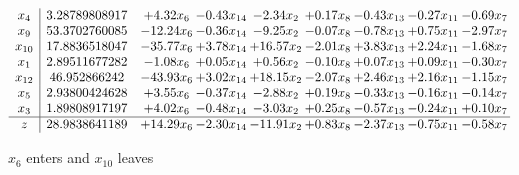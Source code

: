 \documentclass[8pt]{article}
\begin{document}
 \[\begin{array}{c| c c@{\hskip 2pt} c@{\hskip 2pt} c@{\hskip 2pt} c@{\hskip 2pt} c@{\hskip 2pt} c@{\hskip 2pt} c@{\hskip 2pt} }
 x_{4}   &  3.28789808917 & +  4.32 x_{6} & -0.43 x_{14} & -2.34 x_{2} & +  0.17 x_{8} & -0.43 x_{13} & -0.27 x_{11} & -0.69 x_{7}\\
 x_{9}   &  53.3702760085 & -12.24 x_{6} & -0.36 x_{14} & -9.25 x_{2} & -0.07 x_{8} & -0.78 x_{13} & +  0.75 x_{11} & -2.97 x_{7}\\
 x_{10}   &  17.8836518047 & -35.77 x_{6} & +  3.78 x_{14} & + 16.57 x_{2} & -2.01 x_{8} & +  3.83 x_{13} & +  2.24 x_{11} & -1.68 x_{7}\\
 x_{1}   &  2.89511677282 & -1.08 x_{6} & +  0.05 x_{14} & +  0.56 x_{2} & -0.10 x_{8} & +  0.07 x_{13} & +  0.09 x_{11} & -0.30 x_{7}\\
 x_{12}   &  46.952866242 & -43.93 x_{6} & +  3.02 x_{14} & + 18.15 x_{2} & -2.07 x_{8} & +  2.46 x_{13} & +  2.16 x_{11} & -1.15 x_{7}\\
 x_{5}   &  2.93800424628 & +  3.55 x_{6} & -0.37 x_{14} & -2.88 x_{2} & +  0.19 x_{8} & -0.33 x_{13} & -0.16 x_{11} & -0.14 x_{7}\\
 x_{3}   &  1.89808917197 & +  4.02 x_{6} & -0.48 x_{14} & -3.03 x_{2} & +  0.25 x_{8} & -0.57 x_{13} & -0.24 x_{11} & +  0.10 x_{7}\\
\hline
z    &  28.9838641189 & + 14.29 x_{6} & -2.30 x_{14} & -11.91 x_{2} & +  0.83 x_{8} & -2.37 x_{13} & -0.75 x_{11} & -0.58 x_{7}\\
\end{array}\]


 $ x_{6} $ enters and $ x_{10} $ leaves 
\end{document}
